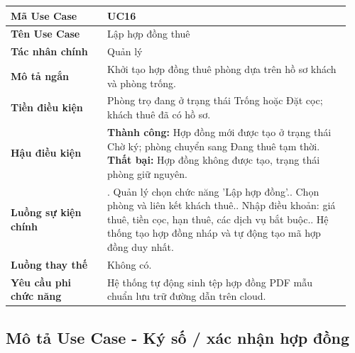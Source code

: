 \documentclass[a4paper,oneside]{report}
\begin{document}
\begin{longtable}[]{@{}>{\RaggedRight\arraybackslash}p{0.27\linewidth}>{\RaggedRight\arraybackslash}p{0.68\linewidth}@{}}
\toprule
\textbf{Mã Use Case} & UC16\tabularnewline
\midrule
\endhead
\textbf{Tên Use Case} & Lập hợp đồng thuê\tabularnewline
\textbf{Tác nhân chính} & Quản lý\tabularnewline
\textbf{Mô tả ngắn} & Khởi tạo hợp đồng thuê phòng dựa trên hồ sơ khách
và phòng trống.\tabularnewline
\textbf{Tiền điều kiện} & Phòng trọ đang ở trạng thái Trống hoặc Đặt
cọc; khách thuê đã có hồ sơ.\tabularnewline
\textbf{Hậu điều kiện} & \textbf{Thành công:} Hợp đồng mới được tạo ở trạng thái Chờ ký; phòng chuyển sang Đang thuê tạm thời.\newline 
\textbf{Thất bại:} Hợp đồng không được tạo, trạng thái phòng giữ nguyên.\tabularnewline
\textbf{Luồng sự kiện chính} & 1. Quản lý chọn chức
năng 'Lập hợp đồng'.\newline 2. Chọn phòng và liên kết khách
thuê.\newline 3. Nhập điều khoản: giá thuê, tiền cọc, hạn thuê, các
dịch vụ bắt buộc.\newline 4. Hệ thống tạo hợp đồng nháp và tự động
tạo mã hợp đồng duy nhất.\tabularnewline
\textbf{Luồng thay thế} & Không có.\tabularnewline
\textbf{Yêu cầu phi chức năng} & Hệ thống tự động sinh tệp hợp đồng PDF
mẫu chuẩn lưu trữ đường dẫn trên cloud.\tabularnewline
\bottomrule
\end{longtable}

\subsection{Mô tả Use Case - Ký số / xác nhận hợp đồng}
\end{document}

